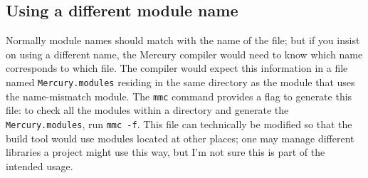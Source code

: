 \subsection{Using a different module name}

Normally module names should match with the name of the file; but if you insist on using a different name, the Mercury compiler would need to know which name corresponds to which file. The compiler would expect this information in a file named \texttt{Mercury.modules} residing in the same directory as the module that uses the name-mismatch module. The \texttt{mmc} command provides a flag to generate this file: to check all the modules within a directory and generate the \texttt{Mercury.modules}, run \texttt{mmc -f}. This file can technically be modified so that the build tool would use modules located at other places; one may manage different libraries a project might use this way, but I'm not sure this is part of the intended usage.



